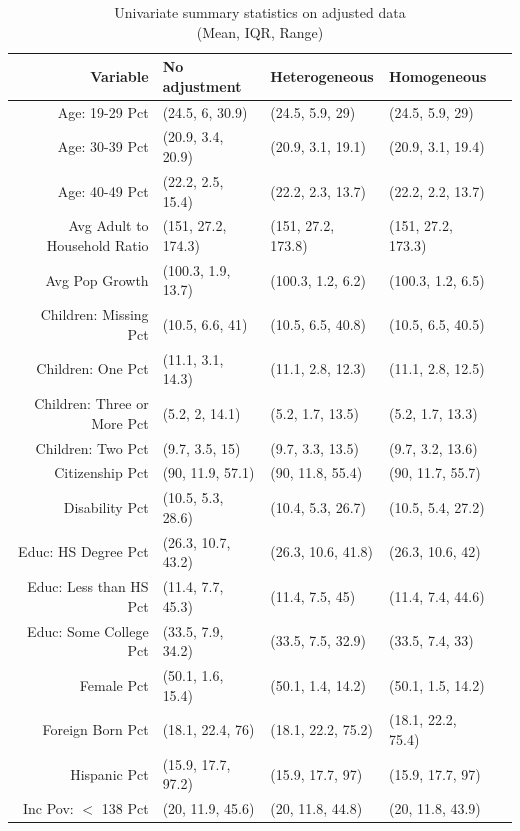 \begin{table}[h!]
\centering
\caption{Univariate summary statistics on adjusted data \\ (Mean, IQR, Range)}\label{tab:summarytab1}
\begin{tabular}{rllll}
  \hline
Variable & No adjustment & Heterogeneous & Homogeneous \\ 
  \hline
  Age: 19-29 Pct & (24.5, 6, 30.9) & (24.5, 5.9, 29) & (24.5, 5.9, 29) \\ 
  Age: 30-39 Pct & (20.9, 3.4, 20.9) & (20.9, 3.1, 19.1) & (20.9, 3.1, 19.4) \\ 
  Age: 40-49 Pct & (22.2, 2.5, 15.4) & (22.2, 2.3, 13.7) & (22.2, 2.2, 13.7) \\ 
  Avg Adult to Household Ratio & (151, 27.2, 174.3) & (151, 27.2, 173.8) & (151, 27.2, 173.3) \\ 
  Avg Pop Growth & (100.3, 1.9, 13.7) & (100.3, 1.2, 6.2) & (100.3, 1.2, 6.5) \\ 
  Children: Missing Pct & (10.5, 6.6, 41) & (10.5, 6.5, 40.8) & (10.5, 6.5, 40.5) \\ 
  Children: One Pct & (11.1, 3.1, 14.3) & (11.1, 2.8, 12.3) & (11.1, 2.8, 12.5) \\ 
  Children: Three or More Pct & (5.2, 2, 14.1) & (5.2, 1.7, 13.5) & (5.2, 1.7, 13.3) \\ 
  Children: Two Pct & (9.7, 3.5, 15) & (9.7, 3.3, 13.5) & (9.7, 3.2, 13.6) \\ 
  Citizenship Pct & (90, 11.9, 57.1) & (90, 11.8, 55.4) & (90, 11.7, 55.7) \\ 
  Disability Pct & (10.5, 5.3, 28.6) & (10.4, 5.3, 26.7) & (10.5, 5.4, 27.2) \\ 
  Educ: HS Degree Pct & (26.3, 10.7, 43.2) & (26.3, 10.6, 41.8) & (26.3, 10.6, 42) \\ 
  Educ: Less than HS Pct & (11.4, 7.7, 45.3) & (11.4, 7.5, 45) & (11.4, 7.4, 44.6) \\ 
  Educ: Some College Pct & (33.5, 7.9, 34.2) & (33.5, 7.5, 32.9) & (33.5, 7.4, 33) \\ 
  Female Pct & (50.1, 1.6, 15.4) & (50.1, 1.4, 14.2) & (50.1, 1.5, 14.2) \\ 
  Foreign Born Pct & (18.1, 22.4, 76) & (18.1, 22.2, 75.2) & (18.1, 22.2, 75.4) \\ 
  Hispanic Pct & (15.9, 17.7, 97.2) & (15.9, 17.7, 97) & (15.9, 17.7, 97) \\ 
  Inc Pov: $<$ 138 Pct & (20, 11.9, 45.6) & (20, 11.8, 44.8) & (20, 11.8, 43.9) \\ 

\end{tabular}
\end{table}
